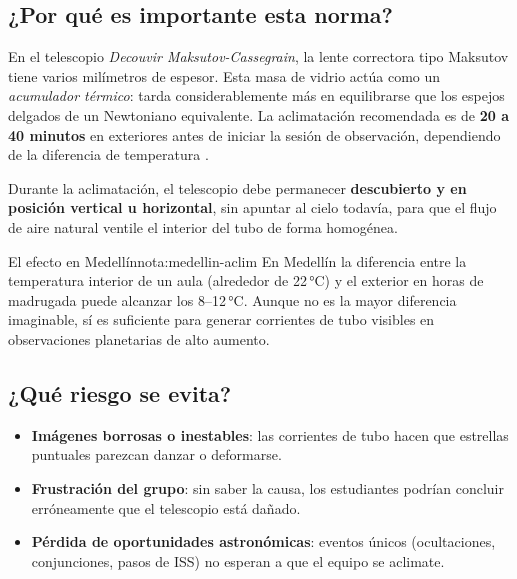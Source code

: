 \documentclass[12pt,oneside]{book}
\begin{document}
\subsection{¿Por qué es importante esta norma?}

En el telescopio \textit{Decouvir Maksutov-Cassegrain}, la lente correctora tipo
Maksutov tiene varios milímetros de espesor. Esta masa de vidrio actúa como un
\emph{acumulador térmico}: tarda considerablemente más en equilibrarse que los
espejos delgados de un Newtoniano equivalente. La aclimatación recomendada es de
\textbf{20 a 40 minutos} en exteriores antes de iniciar la sesión de observación,
dependiendo de la diferencia de temperatura \cite{tonkin2007}.

Durante la aclimatación, el telescopio debe permanecer \textbf{descubierto y en
posición vertical u horizontal}, sin apuntar al cielo todavía, para que el flujo de
aire natural ventile el interior del tubo de forma homogénea.

\begin{nota}{El efecto en Medellín}{nota:medellin-aclim}
    En Medellín la diferencia entre la temperatura interior de un aula (alrededor
    de 22\,°C) y el exterior en horas de madrugada puede alcanzar los 8–12\,°C.
    Aunque no es la mayor diferencia imaginable, sí es suficiente para generar
    corrientes de tubo visibles en observaciones planetarias de alto aumento.
\end{nota}

\subsection{¿Qué riesgo se evita?}

\begin{itemize}[leftmargin=1.5em]
    \item \textbf{Imágenes borrosas o inestables}: las corrientes de tubo hacen
          que estrellas puntuales parezcan danzar o deformarse.
    \item \textbf{Frustración del grupo}: sin saber la causa, los estudiantes
          podrían concluir erróneamente que el telescopio está dañado.
    \item \textbf{Pérdida de oportunidades astronómicas}: eventos únicos (ocultaciones,
          conjunciones, pasos de ISS) no esperan a que el equipo se aclimate.
\end{itemize}
\end{document}
